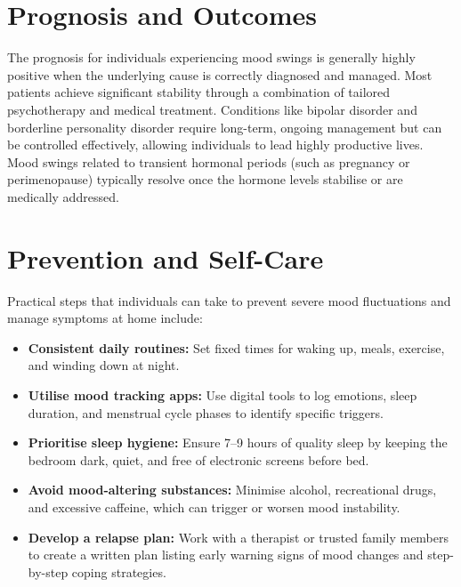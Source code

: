 \section*{Prognosis and Outcomes}
The prognosis for individuals experiencing mood swings is generally highly positive when the underlying cause is correctly diagnosed and managed. Most patients achieve significant stability through a combination of tailored psychotherapy and medical treatment. Conditions like bipolar disorder and borderline personality disorder require long-term, ongoing management but can be controlled effectively, allowing individuals to lead highly productive lives. Mood swings related to transient hormonal periods (such as pregnancy or perimenopause) typically resolve once the hormone levels stabilise or are medically addressed.

\section*{Prevention and Self-Care}
Practical steps that individuals can take to prevent severe mood fluctuations and manage symptoms at home include:
\begin{itemize}
    \item \textbf{Consistent daily routines:} Set fixed times for waking up, meals, exercise, and winding down at night.
    \item \textbf{Utilise mood tracking apps:} Use digital tools to log emotions, sleep duration, and menstrual cycle phases to identify specific triggers.
    \item \textbf{Prioritise sleep hygiene:} Ensure 7--9 hours of quality sleep by keeping the bedroom dark, quiet, and free of electronic screens before bed.
    \item \textbf{Avoid mood-altering substances:} Minimise alcohol, recreational drugs, and excessive caffeine, which can trigger or worsen mood instability.
    \item \textbf{Develop a relapse plan:} Work with a therapist or trusted family members to create a written plan listing early warning signs of mood changes and step-by-step coping strategies.
\end{itemize}

